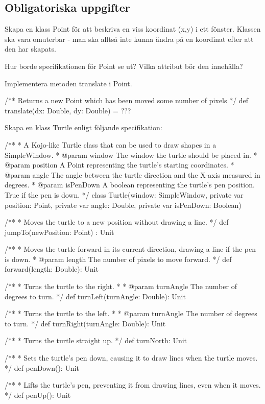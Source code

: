 \subsection{Obligatoriska uppgifter}

\Task Skapa en klass Point för att beskriva en viss koordinat (x,y) i ett fönster. Klassen ska vara omuterbar - man ska alltså inte kunna ändra på en koordinat efter att den har skapats.

\Subtask Hur borde specifikationen för Point se ut? Vilka attribut bör den innehålla?

\Subtask Implementera metoden translate i Point.

\begin{ScalaSpec}
/** Returns a new Point which has been moved some number of pixels */
def translate(dx: Double, dy: Double) = ???
\end{ScalaSpec}

\Task Skapa en klass Turtle enligt följande specifikation:

\begin{ScalaSpec}
/**
  * A Kojo-like Turtle class that can be used to draw shapes
    in a SimpleWindow.
  * @param window     The window the turtle should be placed in.
  * @param position   A Point representing the turtle's starting
                      coordinates.
  * @param angle      The angle between the turtle direction and
                      the X-axis measured in degrees.
  * @param isPenDown  A boolean representing the turtle's pen
                      position. True if the pen is down.
  */
class Turtle(window: SimpleWindow, private var position: Point,
      private var angle: Double, private var isPenDown: Boolean) {
  /**
    * Moves the turtle to a new position without drawing a line.
    */
  def jumpTo(newPosition: Point) : Unit

  /**
    * Moves the turtle forward in its current direction, drawing
      a line if the pen is down.
    * @param length The number of pixels to move forward.
    */
  def forward(length: Double): Unit

  /**
    * Turns the turtle to the right.
    *
    * @param turnAngle The number of degrees to turn.
    */
  def turnLeft(turnAngle: Double): Unit

  /**
    * Turns the turtle to the left.
    *
    * @param turnAngle The number of degrees to turn.
    */
  def turnRight(turnAngle: Double): Unit

  /**
    * Turns the turtle straight up.
    */
  def turnNorth: Unit

  /**
    * Sets the turtle's pen down, causing it to draw lines when
      the turtle moves.
    */
  def penDown(): Unit

  /**
    * Lifts the turtle's pen, preventing it from drawing lines,
      even when it moves.
    */
  def penUp(): Unit
}

\end{ScalaSpec}

